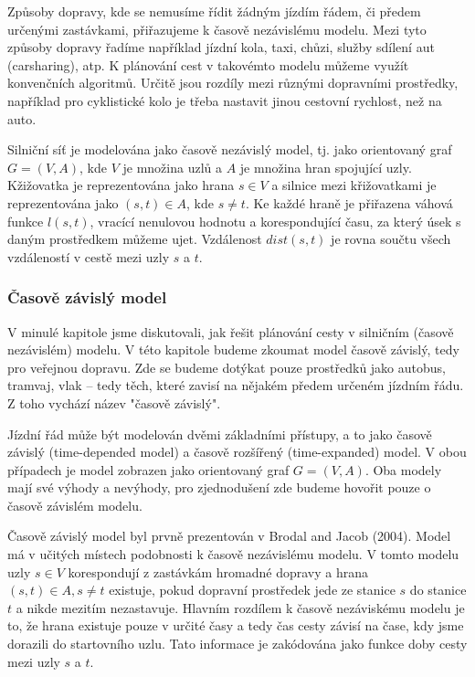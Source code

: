 \documentclass[thesis=M,czech]{FITthesis}[2019/12/23]
\theoremstyle{plain}
\theoremstyle{definition}
\begin{document}
Způsoby dopravy, kde se nemusíme řídit žádným jízdím řádem, či předem určenými zastávkami, přiřazujeme k časově nezávislému modelu. Mezi tyto způsoby dopravy řadíme například jízdní kola, taxi, chůzi, služby sdílení aut (carsharing), atp. K plánování cest v takovémto modelu můžeme využít konvenčních algoritmů. Určitě jsou rozdíly mezi různými dopravními prostředky, například  pro cyklistické kolo je třeba nastavit jinou cestovní rychlost, než na auto. 


Silniční síť je modelována jako časově nezávislý model, tj. jako orientovaný graf $G = (V, A)$, kde $V$ je množina uzlů a $A$ je množina hran spojující uzly. Kžižovatka je reprezentována jako hrana $ s \in V $ a silnice mezi křižovatkami je reprezentována jako  $ (s, t) \in A $, kde $s \neq t $. Ke každé hraně je přiřazena váhová funkce $l(s, t)$, vracící nenulovou hodnotu a korespondující času, za který úsek s daným prostředkem můžeme ujet. Vzdálenost $dist(s,t)$ je rovna součtu všech vzdáleností v cestě mezi uzly $s$ a $t$.



\subsubsection{Časově závislý model}

V minulé kapitole jsme diskutovali, jak řešit plánování cesty v silničním (časově nezávislém) modelu. V této kapitole budeme zkoumat model časově závislý, tedy pro veřejnou dopravu. Zde se budeme dotýkat pouze prostředků jako autobus, tramvaj, vlak -- tedy těch, které zavisí na nějakém předem určeném jízdním řádu. Z toho vychází název "časově závislý".



Jízdní řád může být modelován dvěmi základními přístupy, a to jako časově závislý (time-depended model) a časově rozšířený (time-expanded) model. V obou případech je model zobrazen jako orientovaný graf $G = (V, A)$. Oba modely mají své výhody a nevýhody, pro zjednodušení zde budeme hovořit pouze o časově závislém modelu.

Časově závislý model byl prvně prezentován v Brodal and Jacob (2004). Model má v učitých místech podobnosti k časově nezávislému modelu. V tomto modelu uzly  $ s \in V $ korespondují z zastávkám hromadné dopravy a hrana $ (s, t) \in A, s \neq t $ existuje, pokud dopravní prostředek jede ze stanice $s$ do stanice $t$ a nikde mezitím nezastavuje. Hlavním rozdílem k časově nezáviskému modelu je to, že hrana existuje pouze v určité časy a tedy čas cesty závisí na čase, kdy jsme dorazili do startovního uzlu. Tato informace je zakódována jako funkce doby cesty mezi uzly $s$ a $t$.
\end{document}
